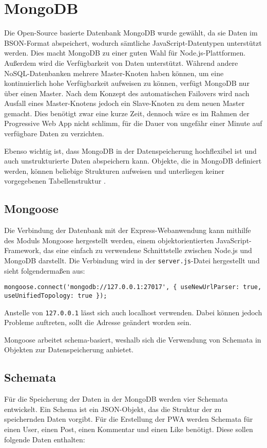 \chapter{MongoDB}

Die Open-Source basierte Datenbank MongoDB wurde gewählt, da sie Daten im BSON-Format abspeichert, wodurch sämtliche JavaScript-Datentypen unterstützt werden. Dies macht MongoDB zu einer guten Wahl für Node.js-Plattformen. Außerdem wird die Verfügbarkeit von Daten unterstützt. Während andere NoSQL-Datenbanken mehrere Master-Knoten haben können, um eine kontinuierlich hohe Verfügbarkeit aufweisen zu können, verfügt MongoDB nur über einen Master. Nach dem Konzept des automatischen Failovers wird nach Ausfall eines Master-Knotens jedoch ein Slave-Knoten zu dem neuen Master gemacht. Dies benötigt zwar eine kurze Zeit, dennoch wäre es im Rahmen der Progressive Web App nicht schlimm, für die Dauer von ungefähr einer Minute auf verfügbare Daten zu verzichten. 

Ebenso wichtig ist, dass MongoDB in der Datenspeicherung hochflexibel ist und auch unstrukturierte Daten abspeichern kann. Objekte, die in MongoDB definiert werden, können beliebige Strukturen aufweisen und unterliegen keiner vorgegebenen Tabellenstruktur \cite{tozzi_2018}.

\section{Mongoose}
Die Verbindung der Datenbank mit der Express-Webanwendung kann mithilfe des Moduls Mongoose hergestellt werden, einem objektorientierten JavaScript-Framework, das eine einfach zu verwendene Schnittstelle zwischen Node.js und MongoDB darstellt. Die Verbindung wird in der \texttt{server.js}-Datei hergestellt und sieht folgendermaßen aus:

\begin{lstlisting}[caption=Herstellen der Verbindung zu MongoDB, label=lst:url]
    mongoose.connect('mongodb://127.0.0.1:27017', { useNewUrlParser: true, useUnifiedTopology: true });
\end{lstlisting}

Anstelle von \texttt{127.0.0.1} lässt sich auch {localhost} verwenden. Dabei können jedoch Probleme auftreten, sollt die Adresse geändert worden sein.

Mongoose arbeitet schema-basiert, weshalb sich die Verwendung von Schemata in Objekten zur Datenspeicherung anbietet.

\section{Schemata}
Für die Speicherung der Daten in der MongoDB werden vier Schemata entwickelt. Ein Schema ist ein JSON-Objekt, das die Struktur der zu speichernden Daten vorgibt. Für die Erstellung der PWA werden Schemata für einen User, einen Post, einen Kommentar und einen Like benötigt. Diese sollen folgende Daten enthalten:


